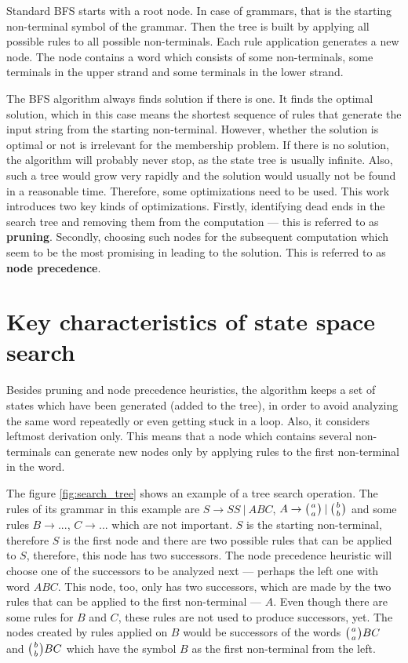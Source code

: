 Standard BFS starts with a root node. In case of grammars, that is the starting non-terminal symbol of the grammar. Then the tree is built by applying all possible rules to all possible non-terminals. Each rule application generates a new node. The node contains a word which consists of some non-terminals, some terminals in the upper strand and some terminals in the lower strand.

The BFS algorithm always finds solution if there is one. It finds the optimal solution, which in this case means the shortest sequence of rules that generate the input string from the starting non-terminal. However, whether the solution is optimal or not is irrelevant for the membership problem. If there is no solution, the algorithm will probably never stop, as the state tree is usually infinite. Also, such a tree would grow very rapidly and the solution would usually not be found in a reasonable time. Therefore, some optimizations need to be used. This work introduces two key kinds of optimizations. Firstly, identifying dead ends in the search tree and removing them from the computation --- this is referred to as \textbf{pruning}. Secondly, choosing such nodes for the subsequent computation which seem to be the most promising in leading to the solution. This is referred to as \textbf{node precedence}.

\section{Key characteristics of state space search}
Besides pruning and node precedence heuristics, the algorithm keeps a set of states which have been generated (added to the tree), in order to avoid analyzing the same word repeatedly or even getting stuck in a loop. Also, it considers leftmost derivation only. This means that a node which contains several non-terminals can generate new nodes only by applying rules to the first non-terminal in the word.

The figure \ref{fig:search_tree} shows an example of a tree search operation. The rules of its grammar in this example are $S \rightarrow S S \:|\: A B C$, $A \rightarrow \wkpair{a}{a} \:|\: \wkpair{b}{b}$ and some rules $B \rightarrow ...$, $C \rightarrow ...$ which are not important. $S$ is the starting non-terminal, therefore $S$ is the first node and there are two possible rules that can be applied to $S$, therefore, this node has two successors. The node precedence heuristic will choose one of the successors to be analyzed next --- perhaps the left one with word $A B C$. This node, too, only has two successors, which are made by the two rules that can be applied to the first non-terminal --- $A$. Even though there are some rules for $B$ and $C$, these rules are not used to produce successors, yet. The nodes created by rules applied on $B$ would be successors of the words $\wkpair{a}{a} B C$ and $\wkpair{b}{b} B C$ which have the symbol $B$ as the first non-terminal from the left.

